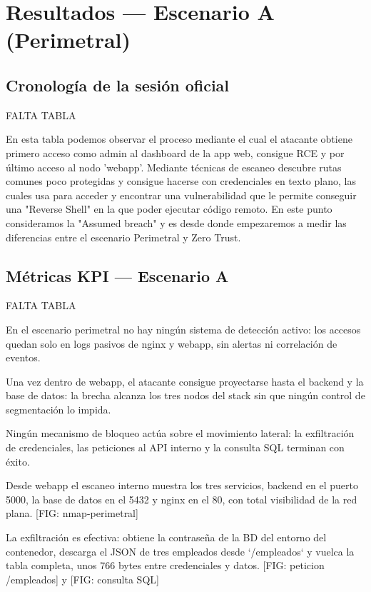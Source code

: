\documentclass[11pt,spanish,listoffigures,listoftables]{tfgetsinf}
\begin{document}
    \section{Resultados — Escenario A (Perimetral)}
        \subsection{Cronología de la sesión oficial}
        FALTA TABLA

        En esta tabla podemos observar el proceso mediante el cual el atacante obtiene primero acceso como admin al dashboard de la app web, consigue RCE y por último acceso al nodo 'webapp'. Mediante técnicas de escaneo descubre rutas comunes poco protegidas y consigue hacerse con credenciales en texto plano, las cuales usa para acceder y encontrar una vulnerabilidad que le permite conseguir una "Reverse Shell" en la que poder ejecutar código remoto. En este punto consideramos la "Assumed breach" y es desde donde empezaremos a medir las diferencias entre el escenario Perimetral y Zero Trust.
        
        \subsection{Métricas KPI — Escenario A}
        FALTA TABLA

        En el escenario perimetral no hay ningún sistema de detección activo: los accesos quedan solo en logs pasivos de nginx y webapp, sin alertas ni correlación de eventos.

        Una vez dentro de webapp, el atacante consigue proyectarse hasta el backend y la base de datos: la brecha alcanza los tres nodos del stack sin que ningún control de segmentación lo impida.
        
        Ningún mecanismo de bloqueo actúa sobre el movimiento lateral: la exfiltración de credenciales, las peticiones al API interno y la consulta SQL terminan con éxito.
        
        Desde webapp el escaneo interno muestra los tres servicios, backend en el puerto 5000, la base de datos en el 5432 y nginx en el 80, con total visibilidad de la red plana. [FIG: nmap-perimetral]
        
        La exfiltración es efectiva: obtiene la contraseña de la BD del entorno del contenedor, descarga el JSON de tres empleados desde `/empleados` y vuelca la tabla completa, unos 766 bytes entre credenciales y datos. [FIG: peticion /empleados] y [FIG: consulta SQL]
        
\end{document}
